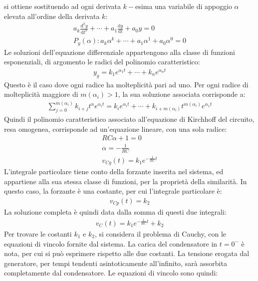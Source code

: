 \documentclass{article}
\newcommand{\df}{\mathrm{d}}
\numberwithin{equation}{subsection}
\begin{document}
si ottiene sostituendo ad ogni derivata $k-$esima una variabile di appoggio $\alpha$ elevata all'ordine della derivata $k$:
\begin{gather*}
    \displaystyle a_k\frac{\df^ky}{\df t^k}+\cdots+a_1\frac{\df  y}{\df t}+a_0y=0\\
    P_y(\alpha):a_k\alpha^k+\cdots+a_1\alpha^1+a_0\alpha^0=0
\end{gather*}
Le soluzioni dell'equazione differenziale appartengono alla classe di funzioni esponenziali, di argomento le radici del polinomio caratteristico:
\begin{gather*}
    y_g=k_1e^{\alpha_1t}+\cdots+k_ne^{\alpha_nt}
\end{gather*}
Questo è il caso dove ogni radice ha molteplicità pari ad uno. Per ogni radice di molteplicità maggiore di $m(\alpha_i)>1$, la sua soluzione associata corrisponde a:
\begin{gather*}
    \displaystyle\sum_{j=0}^{m(\alpha_i)}k_{i+j}t^ne^{\alpha_it}=k_ie^{\alpha_it}+\cdots+k_{i+m(\alpha_i)}t^{m(\alpha_i)}e^{\alpha_1t}
\end{gather*}
Quindi il polinomio caratteristico associato all'equazione di Kirchhoff del circuito, resa omogenea, corrisponde ad un'equazione lineare, con una sola radice:
\begin{gather*}
    RC\alpha+1=0\\
    \alpha=\displaystyle-\frac{1}{RC}\\
    v_{Cg}(t)=k_1e^{-\frac{1}{RC}t}
\end{gather*}
L'integrale particolare tiene conto della forzante inserita nel sistema, ed appartiene alla sua stessa classe di funzioni, per la proprietà della similarità. In questo caso, 
la forzante è una costante, per cui l'integrale particolare è:
\begin{gather*}
    v_{Cp}(t)=k_2
\end{gather*}
La soluzione completa è quindi data dalla somma di questi due integrali:
\begin{gather*}
    v_C(t)=k_1e^{-\frac{1}{RC}t}+k_2
\end{gather*}
Per trovare le costanti $k_1$ e $k_2$, si considera il problema di Cauchy, con le equazioni di vincolo fornite dal sistema. La carica del condensatore in $t=0^-$ è nota, 
per cui si può esprimere rispetto alle due costanti. La tensione erogata dal generatore, per tempi tendenti asintoticamente all'infinito, sarà assorbita 
completamente dal condensatore. Le equazioni di vincolo sono quindi:
\end{document}
